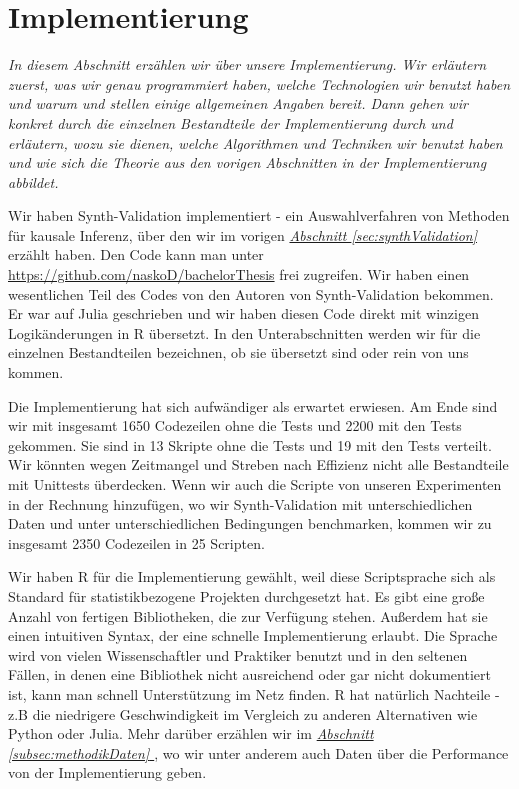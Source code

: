 \documentclass[12pt,a4paper,twoside]{scrartcl}
\numberwithin{equation}{section}
\newcommand{\refsec}[1]{\emph{\hyperref[#1]{Abschnitt \ref*{#1} }}}
\begin{document}
\section{Implementierung}\label{sec:implementierung}
\noindent
\emph{In diesem Abschnitt erzählen wir über unsere Implementierung. Wir erläutern zuerst, was wir genau programmiert haben, welche Technologien wir benutzt haben und warum und stellen einige allgemeinen Angaben bereit. Dann gehen wir konkret durch die einzelnen Bestandteile der Implementierung durch und erläutern, wozu sie dienen, welche Algorithmen und Techniken wir benutzt haben und wie sich die Theorie aus den vorigen Abschnitten in der Implementierung abbildet.}\par

Wir haben Synth-Validation\cite{schuler2017synth} implementiert - ein Auswahlverfahren von Methoden für kausale Inferenz, über den wir im vorigen \refsec{sec:synthValidation} erzählt haben. Den Code kann man unter \url{https://github.com/naskoD/bachelorThesis} frei zugreifen. Wir haben einen wesentlichen Teil des Codes von den Autoren von Synth-Validation bekommen. Er war auf Julia geschrieben und wir haben diesen Code direkt mit winzigen Logikänderungen in R übersetzt. In den Unterabschnitten werden wir für die einzelnen Bestandteilen bezeichnen, ob sie übersetzt sind oder rein von uns kommen.\par 

\noindent
Die Implementierung hat sich aufwändiger als erwartet erwiesen. Am Ende sind wir mit insgesamt 1650 Codezeilen ohne die Tests und 2200 mit den Tests gekommen. Sie sind in 13 Skripte ohne die Tests und 19 mit den Tests verteilt. Wir könnten wegen Zeitmangel und Streben nach Effizienz nicht alle Bestandteile mit Unittests überdecken. Wenn wir auch die Scripte von unseren Experimenten in der Rechnung hinzufügen, wo wir Synth-Validation mit unterschiedlichen Daten und unter unterschiedlichen Bedingungen benchmarken, kommen wir zu insgesamt 2350 Codezeilen in 25 Scripten.\par 

\noindent
Wir haben R für die Implementierung gewählt, weil diese Scriptsprache sich als Standard für statistikbezogene Projekten durchgesetzt hat. Es gibt eine große Anzahl von fertigen Bibliotheken, die zur Verfügung stehen. Außerdem hat sie einen intuitiven Syntax, der eine schnelle Implementierung erlaubt. Die Sprache wird von vielen Wissenschaftler und Praktiker benutzt und in den seltenen Fällen, in denen eine Bibliothek nicht ausreichend oder gar nicht dokumentiert ist, kann man schnell Unterstützung im Netz finden. R hat natürlich Nachteile -  z.B die niedrigere Geschwindigkeit im Vergleich zu anderen Alternativen wie Python oder Julia. Mehr darüber erzählen wir im \refsec{subsec:methodikDaten}, wo wir unter anderem auch Daten über die Performance von der Implementierung geben.\par    
\end{document}
